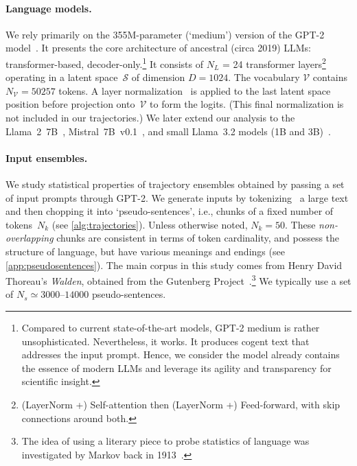 \documentclass{article} %
\begin{document}
\paragraph{Language models.}
We rely primarily on the 355M-parameter (`medium') version of the GPT-2 model~\citep{radford2019language}. 
It presents the core architecture of ancestral (circa 2019) LLMs: transformer-based, decoder-only.\footnote{
Compared to current state-of-the-art models, GPT-2 medium is rather unsophisticated.
Nevertheless, it works. 
It produces cogent text that addresses the input prompt.
Hence, we consider the model already contains the essence of modern LLMs and leverage its agility and transparency for scientific insight.} 
It consists of $N_L$ = 24 transformer layers\footnote{(LayerNorm +) Self-attention then (LayerNorm +) Feed-forward, with skip connections around both.} 
operating in a latent space~$\mathcal{S}$ of dimension $D = 1024$. 
The vocabulary $\mathcal{V}$ contains $N_\mathcal{V} = 50257$ tokens.
A layer normalization~\citep{ba2016layernormalization} is applied to the last latent space position before projection onto~$\mathcal{V}$ to form the logits. (This final normalization is not included in our trajectories.)
We later extend our analysis to the Llama~2~7B~\citep{touvron2023llama2openfoundation}, Mistral~7B~v0.1~\citep{jiang2023mistral7b}, and small Llama~3.2 models (1B and 3B)~\citep{meta2024llama3_2}. 


\paragraph{Input ensembles.}
We study statistical properties of trajectory ensembles obtained by passing a set of input prompts through GPT-2.
We generate inputs by tokenizing~\citep{wolf2020huggingfacestransformersstateoftheartnatural} a large text and then chopping it into `pseudo-sentences', i.e., chunks of a fixed number of tokens~$N_k$ (see \cref{alg:trajectories}). 
Unless otherwise noted, $N_k = 50$.
These \emph{non-overlapping} chunks are consistent in terms of token cardinality, and possess the structure of language, but have various meanings and endings (see \cref{app:pseudosentences}).
The main corpus in this study comes from Henry David Thoreau's \textit{Walden}, obtained from the Gutenberg Project~\citep{gutenberg_project}.\footnote{
The idea of using a literary piece to probe statistics of language was investigated by Markov back in 1913~\citep{Markov_2006}.
} 
We typically use a set of $N_s \simeq 3000 \text{--} 14000$ pseudo-sentences.
\end{document}
